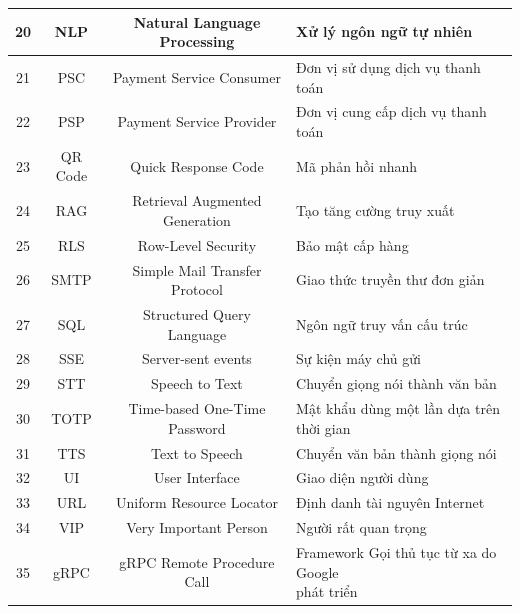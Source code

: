 \begin{table}[ht]
\begin{tabular}{|c|c|c|l|}
20 & NLP & Natural Language Processing & Xử lý ngôn ngữ tự nhiên \\ \hline
21 & PSC & Payment Service Consumer & Đơn vị sử dụng dịch vụ thanh toán \\ \hline
22 & PSP & Payment Service Provider & Đơn vị cung cấp dịch vụ thanh toán \\ \hline
23 & QR Code & Quick Response Code & Mã phản hồi nhanh \\ \hline
24 & RAG & Retrieval Augmented Generation & Tạo tăng cường truy xuất \\ \hline
25 & RLS & Row-Level Security & Bảo mật cấp hàng \\ \hline
26 & SMTP & Simple Mail Transfer Protocol & Giao thức truyền thư đơn giản \\ \hline
27 & SQL & Structured Query Language & Ngôn ngữ truy vấn cấu trúc \\ \hline
28 & SSE & Server-sent events & Sự kiện máy chủ gửi \\ \hline
29 & STT & Speech to Text & Chuyển giọng nói thành văn bản \\ \hline
30 & TOTP & Time-based One-Time Password & Mật khẩu dùng một lần dựa trên thời gian \\ \hline
31 & TTS & Text to Speech & Chuyển văn bản thành giọng nói \\ \hline
32 & UI & User Interface & Giao diện người dùng \\ \hline
33 & URL & Uniform Resource Locator & Định danh tài nguyên Internet \\ \hline
34 & VIP & Very Important Person & Người rất quan trọng \\ \hline
35 & gRPC & gRPC Remote Procedure Call & \makecell[l]{Framework Gọi thủ tục từ xa do Google \\ phát triển} \\ \hline
\end{tabular}
\end{table}

\newpage
